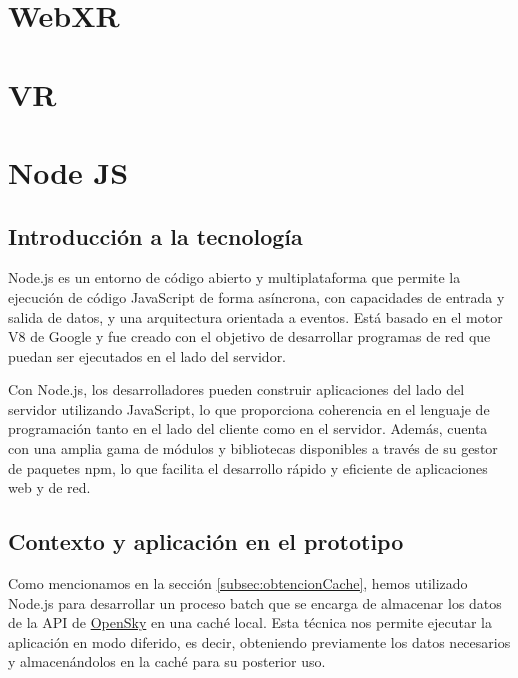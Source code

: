 \documentclass[a4paper, 11pt]{book}
\begin{document}
\section{WebXR}
\section{VR}
\section{Node JS}
\subsection{Introducción a la tecnología}
Node.js es un entorno de código abierto y multiplataforma que permite la ejecución de código JavaScript de forma asíncrona, con capacidades de entrada y salida de datos, y una arquitectura orientada a eventos. Está basado en el motor V8 de Google y fue creado con el objetivo de desarrollar programas de red que puedan ser ejecutados en el lado del servidor.

Con Node.js, los desarrolladores pueden construir aplicaciones del lado del servidor utilizando JavaScript, lo que proporciona coherencia en el lenguaje de programación tanto en el lado del cliente como en el servidor. Además, cuenta con una amplia gama de módulos y bibliotecas disponibles a través de su gestor de paquetes npm, lo que facilita el desarrollo rápido y eficiente de aplicaciones web y de red.
\subsection{Contexto y aplicación en el prototipo}
Como mencionamos en la sección \ref{subsec:obtencionCache}, hemos utilizado Node.js para desarrollar un proceso batch que se encarga de almacenar los datos de la API de \hyperref[sec:opensky]{OpenSky} en una caché local. Esta técnica nos permite ejecutar la aplicación en modo diferido, es decir, obteniendo previamente los datos necesarios y almacenándolos en la caché para su posterior uso.
\end{document}
